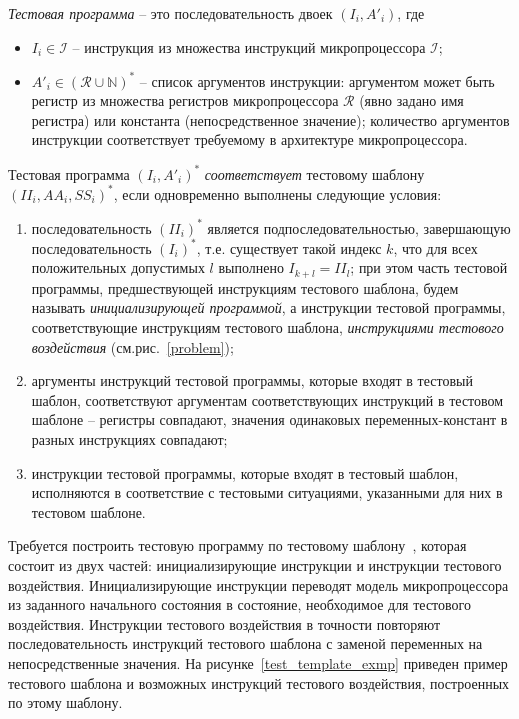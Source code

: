 \emph{Тестовая программа} -- это последовательность двоек $(I_i,
A'_i)$, где
\begin{itemize}
  \item $I_i \in \mathcal{I}$ -- инструкция из множества инструкций
микропроцессора $\mathcal{I}$;
  \item $A'_i \in (\mathcal{R} \cup \mathds{N})^*$ -- список
  аргументов инструкции: аргументом может быть регистр из множества
  регистров микропроцессора $\mathcal{R}$ (явно задано имя регистра)
  или константа (непосредственное значение); количество аргументов
  инструкции соответствует требуемому в архитектуре микропроцессора.
\end{itemize}

Тестовая программа $(I_i, A'_i)^*$ \emph{соответствует} тестовому
шаблону\\ $(II_i, AA_i, SS_i)^*$, если одновременно выполнены
следующие условия:
\begin{enumerate}
  \item последовательность $(II_i)^*$ является
  подпоследовательностью, завершающую последовательность $(I_i)^*$, т.е.
  существует такой индекс $k$, что для всех положительных допустимых $l$
  выполнено $I_{k+l} = II_l$; при этом часть тестовой программы,
  предшествующей инструкциям тестового шаблона, будем называть
  \emph{инициализирующей программой}, а инструкции тестовой программы,
  соответствующие инструкциям тестового шаблона, \emph{инструкциями
  тестового воздействия} (см.рис.~\ref{problem});
  \item аргументы инструкций тестовой программы, которые входят в
  тестовый шаблон, соответствуют аргументам соответствующих
  инструкций в тестовом шаблоне -- регистры совпадают, значения
  одинаковых переменных-констант в разных инструкциях совпадают;
  \item инструкции тестовой программы, которые входят
  в тестовый шаблон, исполняются в соответствие с тестовыми
  ситуациями, указанными для них в тестовом шаблоне.
\end{enumerate}


Требуется построить тестовую программу по тестовому
шаблону~\cite{my_isp_2009, my_programmirovanie_2009}, которая
состоит из двух частей: инициализирующие инструкции и инструкции
тестового воздействия. Инициализирующие
инструкции переводят модель микропроцессора из заданного начального
состояния в состояние, необходимое для тестового воздействия.
Инструкции тестового воздействия в точности повторяют
последовательность инструкций тестового шаблона с заменой переменных
на непосредственные значения. На рисунке~\ref{test_template_exmp}
приведен пример тестового шаблона и возможных инструкций тестового
воздействия, построенных по этому шаблону.

